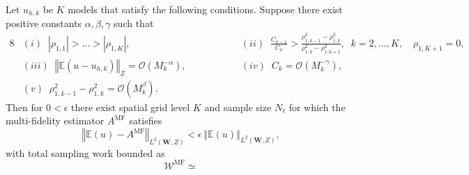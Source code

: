 \begin{theorem}
\label{thm:Sample_cost_est}
Let $u_{h,k}$ be $K$ models that satisfy the following conditions.
Suppose there exist positive constants $\alpha, \beta, \gamma$ such that
%
\begin{alignat*}{8}
    &(i)\;\; |\rho_{1,1}|>\ldots>|\rho_{1,K}|,& \qquad \qquad
    &(ii)\;\; \frac{C_{k-1}}{C_k}>\frac{\rho_{1,k-1}^2-\rho_{1,k}^2}{\rho_{1,k}^2-\rho_{1,k+1}^2},\;\;k=2,\ldots,K, \quad \rho_{1,K+1}=0,\\
    &(iii)\;\; \left\Vert\mathbb{E}\left(u-u_{h,k}\right)\right\Vert_Z=\mathcal{O}\left( M_k^{-\alpha}\right),& \qquad \qquad
    &(iv)\;\; C_k=\mathcal{O}\left( M_k^{-\gamma}\right),\\
    &(v)\;\; \rho_{1,k-1}^2-\rho_{1,k}^2=\mathcal{O}\left( M_k^{\beta}\right).
\end{alignat*}
%
%
Then for $0<\epsilon$ there exist spatial grid level $K$ and sample size $N_\ell$ for which the multi-fidelity estimator $A^{\text{MF}}$ satisfies
\[
\left\Vert\mathbb{E}(u)-A^{\text{MF}} \right\Vert_{L^2(\boldsymbol W,Z)}<\epsilon\,\left\Vert\mathbb{E}(u) \right\Vert_{L^2( \boldsymbol W,Z)},
\]
with total sampling work bounded as
\begin{equation*}
    \mathcal{W}^{\text{MF}} \simeq 
\end{equation*}
\end{theorem}
